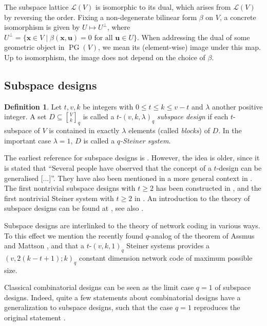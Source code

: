 \documentclass[a4paper,abstracton,12pt]{scrartcl}
\newcommand{\vek}[1]{\mathbf{#1}}
\newcommand{\qbinom}[3]{\genfrac{[}{]}{0pt}{}{#1}{#2}_{#3}}
\DeclareMathOperator{\PG}{PG}
\theoremstyle{definition}
\newtheorem{definition}[lemma]{Definition}
\theoremstyle{remark}
\begin{document}
The subspace lattice $\mathcal{L}(V)$ is isomorphic to its dual, which arises from $\mathcal{L}(V)$ by reversing the order.
Fixing a non-degenerate bilinear form $\beta$ on $V$, a concrete isomorphism is given by $U \mapsto U^\perp$, where $U^\perp = \{\vek{x}\in V \mid \beta(\vek{x},\vek{u}) = 0\text{ for all }\vek{u}\in U\}$.
When addressing the dual of some geometric object in $\PG(V)$, we mean its (element-wise) image under this map.
Up to isomorphism, the image does not depend on the choice of $\beta$.

\subsection{Subspace designs}
\label{subsect:designs}
\begin{definition}
Let $t,v,k$ be integers with $0 \leq t \leq k\leq v-t$ and $\lambda$ another positive integer.
A set $D \subseteq\qbinom{V}{k}{q}$ is called a $t$-$(v,k,\lambda)_q$ \emph{subspace design} if each $t$-subspace of $V$ is contained in exactly $\lambda$ elements (called \emph{blocks}) of $D$.
In the important case $\lambda = 1$, $D$ is called a \emph{$q$-Steiner system}.
\end{definition}

The earliest reference for subspace designs is \cite{Cameron-1974}.
However, the idea is older, since it is stated that ``Several people have observed that the concept of a $t$-design can be generalised [...]''.
They have also been mentioned in a more general context in \cite{Delsarte-1976-JCTSA20[2]:230-243}.
The first nontrivial subspace designs with $t \geq 2$ has been constructed in \cite{Thomas-1987-GeomDed24[2]:237-242}, and the first nontrivial Steiner system with $t \geq 2$ in \cite{Braun-Etzion-Ostergard-Vardy-Wassermann-2016-ForumMathPi:e7}.
An introduction to the theory of subspace designs can be found at \cite{Braun-Kiermaier-Wassermann-2018-COST1}, see also \cite[Day~4]{Suzuki-1989-Designs}.

Subspace designs are interlinked to the theory of network coding in various ways.
To this effect we mention the recently found $q$-analog of the theorem of Assmus and Mattson \cite{Byrne-Ravagnani-SIAMJDM33[3]:1242-1260}, and that a $t$-$(v,k,1)_q$ Steiner systems provides a $(v,2(k-t+1);k)_q$ constant dimension network code of maximum possible size.

Classical combinatorial designs can be seen as the limit case $q=1$ of subspace designs.
Indeed, quite a few statements about combinatorial designs have a generalization to subspace designs, such that the case $q = 1$ reproduces the original statement \cite{Kiermaier-Laue-2015-AiMoC9[1]:105-115, Kiermaier-Pavcevic-2015-JCD23[11]:463-480, Nakic-Pavcevic-2015-DCC77[1]:49-60, Braun-Kiermaier-Kohnert-Laue-2017-JCTSA147:155-185}.
\end{document}
